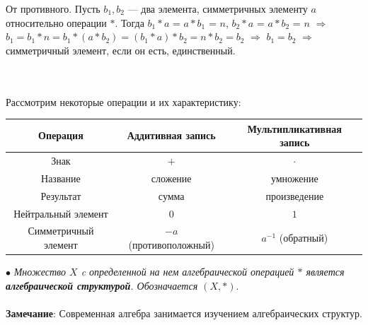 \begin{Proof}
	От противного. Пусть $b_1, b_2$ --- два элемента, симметричных элементу $a$ относительно операции $*$. Тогда $b_1 * a$ = $a * b_1$ = $n$, $b_2 * a$ = $a * b_2$ = $n$ $\Rightarrow$ $b_1 = b_1 * n = b_1 * (a * b_2) = (b_1 * a) * b_2 = n * b_2 = b_2$ $\Rightarrow$ $b_1 = b_2$ $\Rightarrow$ симметричный элемент, если он есть, единственный. \end{Proof} \\\\
Рассмотрим некоторые операции и их характеристику:\begin{center}
	\begin{tabular}{|c|c|c|}
		\hline
		Операция & Аддитивная запись & Мультипликативная запись  \\
		\hline
		Знак & $+$ & $\cdot$ \\
		Название & сложение & умножение \\
		Результат & сумма & произведение \\
		Нейтральный элемент & $0$ & $1$ \\
		Симметричный элемент & $-a$ (противоположный) & $a^{-1}$ (обратный) \\
		\hline
	\end{tabular}
\end{center}
$\bullet$ \textit{Множество $X$ c определенной на нем алгебраической операцией $*$ является \textbf{алгебраической структурой}. Обозначается $(X, *)$}.\\\\
\textbf{Замечание}: Современная алгебра занимается изучением алгебраических структур.



